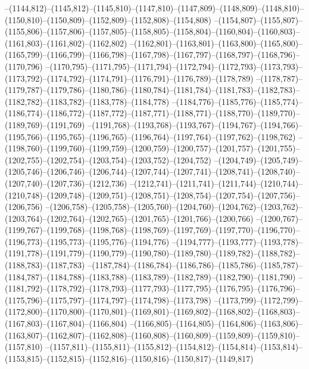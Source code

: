 --(1144,812)--(1145,812)--(1145,810)--(1147,810)--(1147,809)--(1148,809)--(1148,810)--(1150,810)--(1150,809)--(1152,809)--(1152,808)--(1154,808)
--(1154,807)--(1155,807)--(1155,806)--(1157,806)--(1157,805)--(1158,805)--(1158,804)--(1160,804)--(1160,803)--(1161,803)--(1161,802)--(1162,802)
--(1162,801)--(1163,801)--(1163,800)--(1165,800)--(1165,799)--(1166,799)--(1166,798)--(1167,798)--(1167,797)--(1168,797)--(1168,796)--(1170,796)
--(1170,795)--(1171,795)--(1171,794)--(1172,794)--(1172,793)--(1173,793)--(1173,792)--(1174,792)--(1174,791)--(1176,791)--(1176,789)--(1178,789)
--(1178,787)--(1179,787)--(1179,786)--(1180,786)--(1180,784)--(1181,784)--(1181,783)--(1182,783)--(1182,782)--(1183,782)--(1183,778)--(1184,778)
--(1184,776)--(1185,776)--(1185,774)--(1186,774)--(1186,772)--(1187,772)--(1187,771)--(1188,771)--(1188,770)--(1189,770)--(1189,769)--(1191,769)
--(1191,768)--(1193,768)--(1193,767)--(1194,767)--(1194,766)--(1195,766)--(1195,765)--(1196,765)--(1196,764)--(1197,764)--(1197,762)--(1198,762)
--(1198,760)--(1199,760)--(1199,759)--(1200,759)--(1200,757)--(1201,757)--(1201,755)--(1202,755)--(1202,754)--(1203,754)--(1203,752)--(1204,752)
--(1204,749)--(1205,749)--(1205,746)--(1206,746)--(1206,744)--(1207,744)--(1207,741)--(1208,741)--(1208,740)--(1207,740)--(1207,736)--(1212,736)
--(1212,741)--(1211,741)--(1211,744)--(1210,744)--(1210,748)--(1209,748)--(1209,751)--(1208,751)--(1208,754)--(1207,754)--(1207,756)--(1206,756)
--(1206,758)--(1205,758)--(1205,760)--(1204,760)--(1204,762)--(1203,762)--(1203,764)--(1202,764)--(1202,765)--(1201,765)--(1201,766)--(1200,766)
--(1200,767)--(1199,767)--(1199,768)--(1198,768)--(1198,769)--(1197,769)--(1197,770)--(1196,770)--(1196,773)--(1195,773)--(1195,776)--(1194,776)
--(1194,777)--(1193,777)--(1193,778)--(1191,778)--(1191,779)--(1190,779)--(1190,780)--(1189,780)--(1189,782)--(1188,782)--(1188,783)--(1187,783)
--(1187,784)--(1186,784)--(1186,786)--(1185,786)--(1185,787)--(1184,787)--(1184,788)--(1183,788)--(1183,789)--(1182,789)--(1182,790)--(1181,790)
--(1181,792)--(1178,792)--(1178,793)--(1177,793)--(1177,795)--(1176,795)--(1176,796)--(1175,796)--(1175,797)--(1174,797)--(1174,798)--(1173,798)
--(1173,799)--(1172,799)--(1172,800)--(1170,800)--(1170,801)--(1169,801)--(1169,802)--(1168,802)--(1168,803)--(1167,803)--(1167,804)--(1166,804)
--(1166,805)--(1164,805)--(1164,806)--(1163,806)--(1163,807)--(1162,807)--(1162,808)--(1160,808)--(1160,809)--(1159,809)--(1159,810)--(1157,810)
--(1157,811)--(1155,811)--(1155,812)--(1154,812)--(1154,814)--(1153,814)--(1153,815)--(1152,815)--(1152,816)--(1150,816)--(1150,817)--(1149,817)
